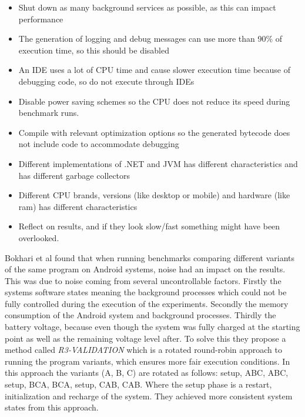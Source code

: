 \begin{itemize}
    \item Shut down as many background services as possible, as this can impact performance
    \item The generation of logging and debug messages can use more than 90\% of execution time, so this should be disabled
    \item An IDE uses a lot of CPU time and cause slower execution time because of debugging code, so do not execute through IDEs
    \item Disable power saving schemes so the CPU does not reduce its speed during benchmark runs.
    \item Compile with relevant optimization options so the generated bytecode does not include code to accommodate debugging
    \item Different implementations of .NET and JVM has different characteristics and has different garbage collectors
    \item Different CPU brands, versions (like desktop or mobile) and hardware (like ram) has different characteristics
    \item Reflect on results, and if they look slow/fast something might have been overlooked.
\end{itemize}



Bokhari et al\cite{Bokhari2020r3} found that when running benchmarks comparing different variants of the same program on Android systems, noise had an impact on the results. This was due to noise coming from several uncontrollable factors. Firstly the systems software states meaning the background processes which could not be fully controlled during the execution of the experiments. Secondly the memory consumption of the Android system and background processes. Thirdly the battery voltage, because even though the system was fully charged at the starting point as well as the remaining voltage level after. To solve this they propose a method called \textit{R3-VALIDATION} which is a rotated round-robin approach to running the program variants, which ensures more fair execution conditions. In this approach the variants (A, B, C) are rotated as follows: setup, ABC, ABC, setup, BCA, BCA, setup, CAB, CAB. Where the setup phase is a restart, initialization and recharge of the system. They achieved more consistent system states from this approach.